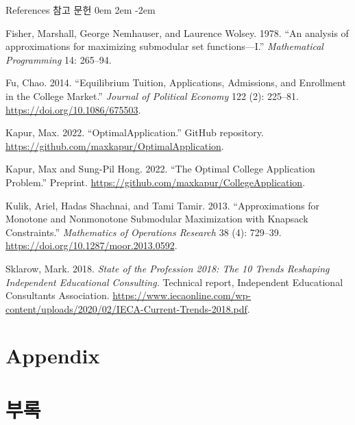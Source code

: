 \documentclass[11pt,slidestop,compress,mathserif,notheorems]{beamer}
\theoremstyle{definition}
\theoremstyle{definition}
\begin{document}
\begin{frame}[allowframebreaks]{\ifen References \else 참고 문헌 \fi}
\scriptsize
\parskip 0em
\leftskip 2em
\parindent -2em


Fisher, Marshall, George Nemhauser, and Laurence Wolsey. 1978. ``An analysis of approximations for maximizing submodular set functions—I.'' \emph{Mathematical Programming} 14: 265--94. 

Fu, Chao. 2014. ``Equilibrium Tuition, Applications, Admissions, and Enrollment in the College Market.'' \emph{Journal of Political Economy} 122 (2): 225--81. \url{https://doi.org/10.1086/675503}. 

Kapur, Max. 2022. ``OptimalApplication.'' GitHub repository. \url{https://github.com/maxkapur/OptimalApplication}.

Kapur, Max and Sung-Pil Hong. 2022. ``The Optimal College Application Problem.'' Preprint. \url{https://github.com/maxkapur/CollegeApplication}.

Kulik, Ariel, Hadas Shachnai, and Tami Tamir. 2013. ``Approximations for Monotone and Nonmonotone Submodular Maximization with Knapsack Constraints.'' \emph{Mathematics of Operations Research} 38 (4): 729--39. \url{https://doi.org/10.1287/moor.2013.0592}.

%

Sklarow, Mark. 2018. \emph{State of the Profession 2018: The 10 Trends Reshaping Independent Educational Consulting.} Technical report, Independent Educational Consultants Association. \url{https://www.iecaonline.com/wp-content/uploads/2020/02/IECA-Current-Trends-2018.pdf}.

\end{frame}








\ifen \section{Appendix} \else \section{부록} \fi
\end{document}
